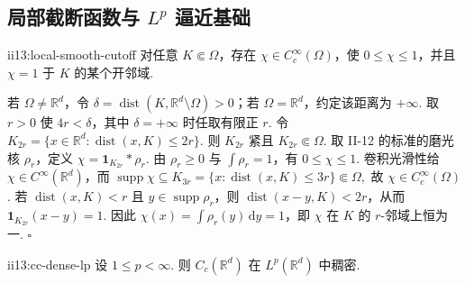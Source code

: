 \subsection{局部截断函数与 \texorpdfstring{\(\displaystyle L^p\)}{Lp} 逼近基础}

\begin{FALemma}[B][局部光滑截断函数]{ii13:local-smooth-cutoff}
对任意 \(\displaystyle K\Subset\Omega\)，存在 \(\displaystyle\chi\in C_c^\infty(\Omega)\)，使 \(\displaystyle0\leqslant\chi\leqslant1\)，并且 \(\displaystyle\chi=1\) 于 \(\displaystyle K\) 的某个开邻域.
\end{FALemma}

\begin{FAProof}
若 \(\displaystyle\Omega\neq\mathbb R^d\)，令 \(\displaystyle\delta=\operatorname{dist}(K,\mathbb R^d\setminus\Omega)>0\)；若 \(\displaystyle\Omega=\mathbb R^d\)，约定该距离为 \(\displaystyle+\infty\). 取 \(\displaystyle r>0\) 使 \(\displaystyle4r<\delta\)，其中 \(\displaystyle\delta=+\infty\) 时任取有限正 \(\displaystyle r\). 令 \(\displaystyle K_{2r}=\{x\in\mathbb R^d:\operatorname{dist}(x,K)\leqslant2r\}.\)
则 \(\displaystyle K_{2r}\) 紧且 \(\displaystyle K_{2r}\Subset\Omega\). 取 II-12 的标准的磨光核 \(\displaystyle\rho_r\)，定义 \(\displaystyle \chi=\mathbf1_{K_{2r}}*\rho_r.\)
由 \(\displaystyle\rho_r\geqslant0\) 与 \(\displaystyle\int\rho_r=1\)，有 \(\displaystyle0\leqslant\chi\leqslant1\). 卷积光滑性给 \(\displaystyle\chi\in C^\infty(\mathbb R^d)\)，而 \(\displaystyle \operatorname{supp}\chi \subseteq K_{3r} = \{x:\operatorname{dist}(x,K)\leqslant3r\} \Subset\Omega,\)
故 \(\displaystyle\chi\in C_c^\infty(\Omega)\). 若 \(\displaystyle\operatorname{dist}(x,K)<r\) 且 \(\displaystyle y\in\operatorname{supp}\rho_r\)，则 \(\displaystyle\operatorname{dist}(x-y,K)<2r\)，从而 \(\displaystyle\mathbf1_{K_{2r}}(x-y)=1\). 因此 \(\displaystyle\chi(x)=\int\rho_r(y)\,\mathrm{d}y=1\)，即 \(\displaystyle\chi\) 在 \(\displaystyle K\) 的 \(\displaystyle r\)-邻域上恒为一.
\hfill\(\square\)
\end{FAProof}

\begin{FALemma}{ii13:cc-dense-lp}
设 \(\displaystyle1\leqslant p<\infty\). 则 \(\displaystyle C_c(\mathbb R^d)\) 在 \(\displaystyle L^p(\mathbb R^d)\) 中稠密.
\end{FALemma}

